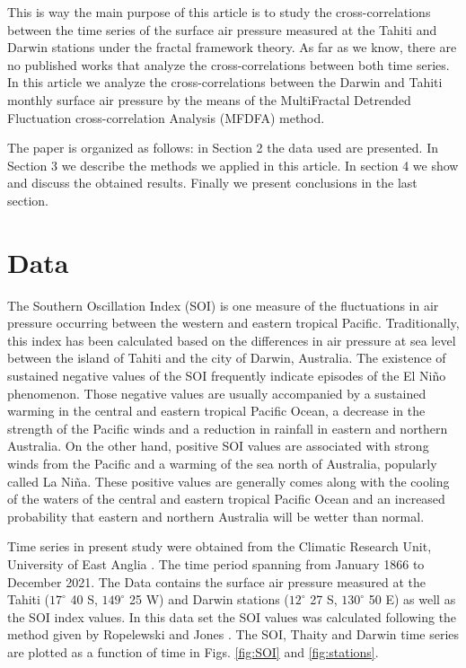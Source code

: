 \documentclass[onecolumn, preprint,aps,amsmath, amssymb, superscriptaddress]{revtex4}
\begin{document}
This is way the main purpose of this article is to study the cross-correlations between the time series of the surface air pressure measured at the Tahiti and Darwin stations under the fractal framework theory. As far as we know, there are no published works that analyze the cross-correlations between both time series. In this article we analyze the cross-correlations between the Darwin and Tahiti monthly surface air pressure by the means of the MultiFractal Detrended Fluctuation cross-correlation Analysis (MFDFA) method.

The paper is organized as follows: in Section 2 the data used are presented. In Section 3 we describe the methods we applied in this article. In section 4 we show and discuss the obtained results. Finally we present conclusions in the last section.

\section{Data}
\label{sec:Data}

The Southern Oscillation Index (SOI) is one measure of the fluctuations in air pressure occurring between the western and eastern tropical Pacific. Traditionally, this index has been calculated based on the differences in air pressure at sea level between the island of Tahiti and the city of Darwin, Australia. The existence of sustained negative values of the SOI frequently indicate episodes of the El Niño phenomenon. Those negative values are usually accompanied by a sustained warming in the central and eastern tropical Pacific Ocean, a decrease in the strength of the Pacific winds and  a reduction in rainfall in eastern and northern Australia.  On the other hand, positive SOI values are associated with strong winds from the Pacific and a warming of the sea north of Australia, popularly called La Niña. These positive values are generally comes along with the cooling of the waters of the central and eastern tropical Pacific Ocean and an increased probability that eastern and northern Australia will be wetter than normal.

Time series in present study were obtained from the Climatic Research Unit, University of East Anglia \cite{Anglia}. The time period spanning from January 1866 to December 2021. The Data contains the surface air pressure measured at the Tahiti ($17^{\circ}$ 40 S, $149^{\circ}$ 25 W) and Darwin stations  ($12^{\circ}$ 27 S, $130^{\circ}$ 50 E) as well as the SOI index values. In this data set the SOI values was calculated following the method given by Ropelewski and Jones \cite{Ropelewski}.
The SOI, Thaity and Darwin time series are plotted as a function of time in Figs. \ref{fig:SOI} and \ref{fig:stations}. 
\end{document}
